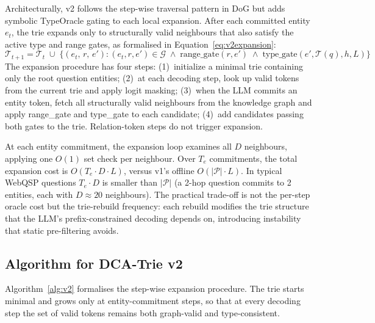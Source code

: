Architecturally, v2 follows the step-wise traversal pattern in DoG \citep{li2024-decoding-on-graphs} but adds symbolic TypeOracle gating to each local expansion. After each committed entity $e_t$, the trie expands only to structurally valid neighbours that also satisfy the active type and range gates, as formalised in Equation~\eqref{eq:v2expansion}:
\begin{equation}
  \mathcal{T}_{t+1} = \mathcal{T}_t \;\cup\; \bigl\{(e_t,\, r,\, e') :
  (e_t, r, e') \in \mathcal{G} \;\land\;
  \text{range\_gate}(r, e') \;\land\;
  \text{type\_gate}(e', \mathcal{T}(q), h, L)\bigr\}
  \label{eq:v2expansion}
\end{equation}
The expansion procedure has four steps: (1)~initialize a minimal trie containing only the root question entities; (2)~at each decoding step, look up valid tokens from the current trie and apply logit masking; (3)~when the LLM commits an entity token, fetch all structurally valid neighbours from the knowledge graph and apply range\_gate and type\_gate to each candidate; (4)~add candidates passing both gates to the trie. Relation-token steps do not trigger expansion.

At each entity commitment, the expansion loop examines all $D$ neighbours, applying one $O(1)$ set check per neighbour. Over $T_e$ commitments, the total expansion cost is $O(T_e \cdot D \cdot L)$, versus v1's offline $O(|\mathcal{P}| \cdot L)$. In typical WebQSP questions $T_e \cdot D$ is smaller than $|\mathcal{P}|$ (a 2-hop question commits to 2 entities, each with $D \approx 20$ neighbours). The practical trade-off is not the per-step oracle cost but the trie-rebuild frequency: each rebuild modifies the trie structure that the LLM's prefix-constrained decoding depends on, introducing instability that static pre-filtering avoids.

\subsection{Algorithm for DCA-Trie v2}

Algorithm~\ref{alg:v2} formalises the step-wise expansion procedure. The trie starts minimal and grows only at entity-commitment steps, so that at every decoding step the set of valid tokens remains both graph-valid and type-consistent.

